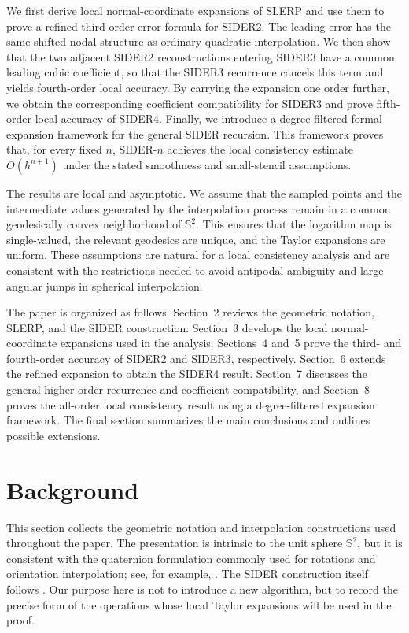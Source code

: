 \documentclass[a4paper,11pt]{article}
\newcommand{\bS}{\mathbb{S}}
\numberwithin{equation}{section}
\begin{document}
We first derive local normal-coordinate expansions of SLERP and use them to
prove a refined third-order error formula for SIDER2.  The leading error has
the same shifted nodal structure as ordinary quadratic interpolation.  We then
show that the two adjacent SIDER2 reconstructions entering SIDER3 have a common
leading cubic coefficient, so that the SIDER3 recurrence cancels this term and
yields fourth-order local accuracy.  By carrying the expansion one order
further, we obtain the corresponding coefficient compatibility for SIDER3 and
prove fifth-order local accuracy of SIDER4.  Finally, we introduce a
degree-filtered formal expansion framework for the general SIDER recursion.
This framework proves that, for every fixed \(n\), SIDER-\(n\) achieves the
local consistency estimate \(O(h^{n+1})\) under the stated smoothness and
small-stencil assumptions.

The results are local and asymptotic.  We assume that the sampled points and
the intermediate values generated by the interpolation process remain in a
common geodesically convex neighborhood of \(\bS^2\).  This ensures that the
logarithm map is single-valued, the relevant geodesics are unique, and the
Taylor expansions are uniform.  These assumptions are natural for a local
consistency analysis and are consistent with the restrictions needed to avoid
antipodal ambiguity and large angular jumps in spherical interpolation.

The paper is organized as follows.  Section~2 reviews the geometric notation,
SLERP, and the SIDER construction.  Section~3 develops the local
normal-coordinate expansions used in the analysis.  Sections~4 and~5 prove the
third- and fourth-order accuracy of SIDER2 and SIDER3, respectively.
Section~6 extends the refined expansion to obtain the SIDER4 result.
Section~7 discusses the general higher-order recurrence and coefficient
compatibility, and Section~8 proves the all-order local consistency result
using a degree-filtered expansion framework.  The final section summarizes the
main conclusions and outlines possible extensions.

\section{Background}

This section collects the geometric notation and interpolation constructions
used throughout the paper.  The presentation is intrinsic to the unit sphere
\(\bS^2\), but it is consistent with the quaternion formulation commonly used
for rotations and orientation interpolation; see, for example,
\cite{ham63,kui02,muk02,zha97}.  The SIDER construction itself follows
\cite{fonleu23}.  Our purpose here is not to introduce a new algorithm,
but to record the precise form of the operations whose local Taylor expansions
will be used in the proof.
\end{document}
